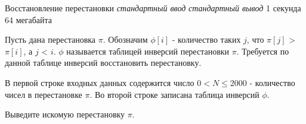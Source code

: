 \begin{problem}%
{Восстановление перестановки}%
{\textsl{стандартный ввод}}%
{\textsl{стандартный вывод}}%
{1 секунда}%
{64 мегабайта}{}

Пусть дана перестановка $\pi$. Обозначим $\phi[i]$ - количество таких $j$, что $\pi[j]$ > $\pi[i]$, а $j$ < $i$. $\phi$ называется таблицей инверсий перестановки $\pi$. Требуется по данной таблице инверсий восстановить перестановку.

\InputFile

В первой строке входных данных содержится число $0 < N \le 2000$ - количество чисел в перестановке $\pi$. Во второй строке записана таблица инверсий $\phi$.

\OutputFile

Выведите искомую перестановку $\pi$.

\Examples

\begin{example}
%
\end{example}
\end{problem}